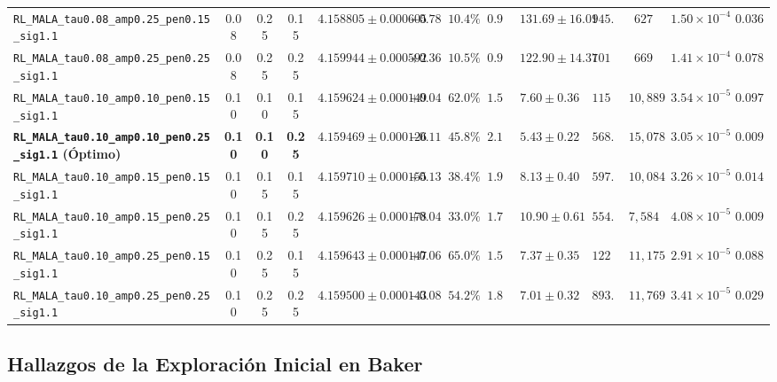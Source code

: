 \documentclass[10pt,a4paper]{article}
\begin{document}
\begin{table}[H]
\begin{adjustbox}{max width=\textwidth}
\begin{tabular}{lcccccccccccc}
\texttt{RL\_MALA\_tau0.08\_amp0.25\_pen0.15\_sig1.1} & 0.08 & 0.25 & 0.15 & $4.158805 \pm 0.000605$ & $-0.78$ & $10.4\%$ & $0.916$ & $131.69 \pm 16.01$ & $945.9$ & $627$ & $1.50 \times 10^{-4}$ & $0.03699$ \\
\texttt{RL\_MALA\_tau0.08\_amp0.25\_pen0.25\_sig1.1} & 0.08 & 0.25 & 0.25 & $4.159944 \pm 0.000592$ & $+0.36$ & $10.5\%$ & $0.930$ & $122.90 \pm 14.37$ & $1017.1$ & $669$ & $1.41 \times 10^{-4}$ & $0.07855$ \\
\texttt{RL\_MALA\_tau0.10\_amp0.10\_pen0.15\_sig1.1} & 0.10 & 0.10 & 0.15 & $4.159624 \pm 0.000149$ & $+0.04$ & $62.0\%$ & $1.564$ & $7.60 \pm 0.36$ & $1150.7$ & $10,889$ & $3.54 \times 10^{-5}$ & $0.09772$ \\
\textbf{\texttt{RL\_MALA\_tau0.10\_amp0.10\_pen0.25\_sig1.1} (Óptimo)} & \textbf{0.10} & \textbf{0.10} & \textbf{0.25} & \textbf{$4.159469 \pm 0.000126$} & \textbf{$-0.11$} & \textbf{$45.8\%$} & \textbf{$2.156$} & \textbf{$5.43 \pm 0.22$} & \textbf{$568.5$} & \textbf{$15,078$} & \textbf{$3.05 \times 10^{-5}$} & \textbf{$0.00958$} \\
\texttt{RL\_MALA\_tau0.10\_amp0.15\_pen0.15\_sig1.1} & 0.10 & 0.15 & 0.15 & $4.159710 \pm 0.000155$ & $+0.13$ & $38.4\%$ & $1.908$ & $8.13 \pm 0.40$ & $597.2$ & $10,084$ & $3.26 \times 10^{-5}$ & $0.01451$ \\
\texttt{RL\_MALA\_tau0.10\_amp0.15\_pen0.25\_sig1.1} & 0.10 & 0.15 & 0.25 & $4.159626 \pm 0.000178$ & $+0.04$ & $33.0\%$ & $1.727$ & $10.90 \pm 0.61$ & $554.7$ & $7,584$ & $4.08 \times 10^{-5}$ & $0.00998$ \\
\texttt{RL\_MALA\_tau0.10\_amp0.25\_pen0.15\_sig1.1} & 0.10 & 0.25 & 0.15 & $4.159643 \pm 0.000147$ & $+0.06$ & $65.0\%$ & $1.594$ & $7.37 \pm 0.35$ & $1224.2$ & $11,175$ & $2.91 \times 10^{-5}$ & $0.08826$ \\
\texttt{RL\_MALA\_tau0.10\_amp0.25\_pen0.25\_sig1.1} & 0.10 & 0.25 & 0.25 & $4.159500 \pm 0.000143$ & $-0.08$ & $54.2\%$ & $1.802$ & $7.01 \pm 0.32$ & $893.7$ & $11,769$ & $3.41 \times 10^{-5}$ & $0.02975$ \\
\bottomrule
\end{tabular}
\end{adjustbox}
\end{table}



\subsection{Hallazgos de la Exploración Inicial en Baker}
\end{document}
